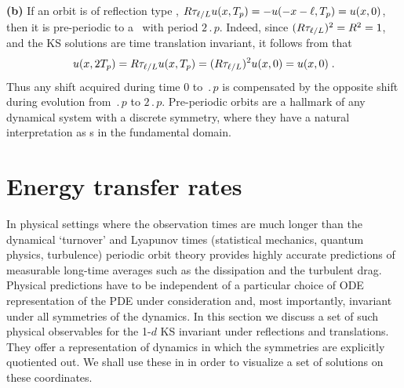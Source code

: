 {\bf (b)} 
If an
orbit is of reflection type ,
$R\tau_{\ell/L} u(x,{T_{p}}) =
-u(-x-\ell,{T_{p}}) = u(x,0)$, then it is
pre-periodic to a \po\ with period
$2\period{p}$.
Indeed, since $(R\tau_{\ell/L})^2 = R^2 = 1$,
 and the KS solutions
are time translation invariant, it follows
from  that
\[
  u(x,2{T_{p}}) = R\tau_{\ell/L} u(x,{T_{p}}) =
  (R\tau_{\ell/L})^2 u(x,0) = u(x,0)\;.
\]
Thus any shift acquired during time $0$ to
$\period{p}$ is compensated by the opposite shift during
evolution from $\period{p}$ to $2 \period{p}$.
Pre-periodic orbits are a hallmark of any dynamical system
with a discrete symmetry, where they have a natural
interpretation as \po s in the fundamental
domain.

\section{Energy transfer rates}
\label{sec:energy}

In physical settings where the observation times are much
longer than the dynamical `turnover' and Lyapunov times
(statistical mechanics, quantum physics, turbulence) periodic
orbit theory provides highly accurate predictions
of measurable long-time averages such as the dissipation and
the turbulent drag. Physical predictions have to
be independent of a particular choice of ODE representation
of the PDE under consideration and, most importantly,
invariant under all symmetries of the dynamics. In this
section we discuss a set of such physical observables for the
1-$d$ KS invariant under reflections and translations. They
offer a representation of dynamics in which the symmetries
are explicitly quotiented out. We shall use these
 in  in order to
visualize a set of solutions on these coordinates.

